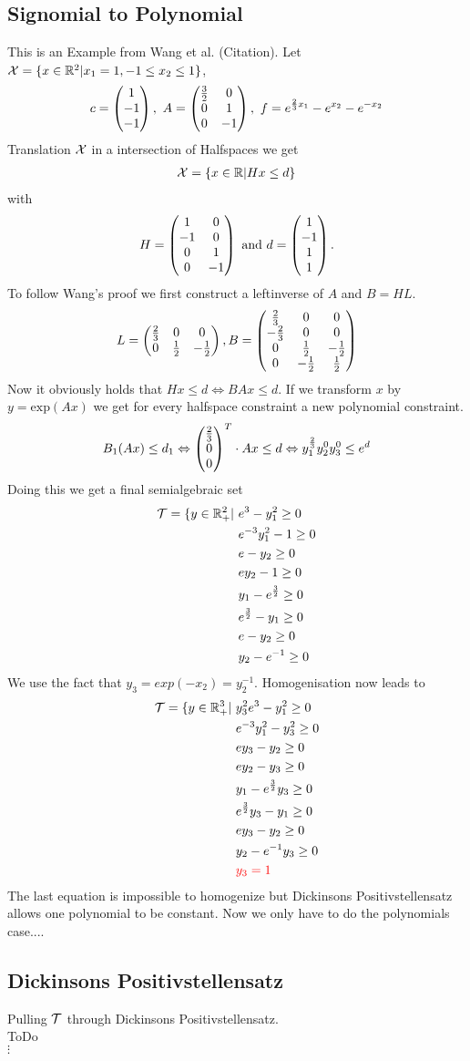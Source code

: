 \documentclass[./main.tex]{subfiles}
\begin{document}
\subsection{Signomial to Polynomial}
This is an Example from Wang et al. (Citation). Let $\mathcal X = \lbrace x \in \mathbb{R}^2 | x_1 = 1, -1\leq x_2 \leq 1 \rbrace$, 
\begin{equation*}
c = \begin{pmatrix}1\\-1\\-1\end{pmatrix}, \ A =  \begin{pmatrix} \frac 3 2 & 0 \\ 0 & 1 \\ 0 & -1 \end{pmatrix}, \ f=e^{\frac 2 3 x_1} - e^{x_2} - e^{-x_2}
\end{equation*}
Translation $\mathcal{X}$ in a intersection of Halfspaces we get
\begin{align*}
\mathcal{X} = \lbrace x \in \mathbb{R} \vert Hx \leq d \rbrace
\end{align*}
with
\begin{align*}
H =  \begin{pmatrix} 1 & 0 \\ -1 & 0 \\ 0 & 1 \\ 0 & -1 \end{pmatrix} \text{ and } d = \begin{pmatrix}1\\-1\\1\\1\end{pmatrix}.
\end{align*}
To follow Wang's proof we first construct a leftinverse of $A$ and $B=HL$.
\begin{align*}
L = \begin{pmatrix} \frac 2 3 & 0 & 0 \\ 0 & \frac 1 2 & -\frac 1 2 \\ \end{pmatrix}, B = \begin{pmatrix} \frac 2 3 & 0 & 0 \\ -\frac 2 3 & 0 & 0 \\ 0 & \frac 1 2 & -\frac 1 2 \\ 0 & -\frac 1 2 & \frac 1 2 \\ \end{pmatrix}
\end{align*}
Now it obviously holds that $Hx \leq d  \Leftrightarrow BAx \leq d$. If we transform $x$ by $y=\text{exp}(Ax)$ we get for every halfspace constraint a new polynomial constraint.
\begin{align*}
B_1(Ax) \leq d_1 \Leftrightarrow  \begin{pmatrix}\frac 2 3\\0\\0\end{pmatrix}^T  \cdot Ax \leq d \Leftrightarrow y_1^{\frac 2 3}y_2^0y_3^0 \leq e^d
\end{align*}
Doing this we get a final semialgebraic set
\begin{align*}
\mathcal{T} = \lbrace y \in \mathbb{R}^2_+ \vert \ & e^3 - y_1^2 \geq 0 \\
& e^{-3}y_1^2 -1 \geq 0 \\
& e - y_2 \geq 0\\
& ey_2 - 1 \geq 0 \\
& y_1 - e^{\frac 3 2} \geq 0 \\
& e^{\frac 3 2} - y_1 \geq 0 \\
&e- y_2 \geq 0 \\
&y_2 -e^{-1}  \geq 0
\end{align*}
We use the fact that $y_3 = exp(-x_2) = y_2^{-1}.$ Homogenisation now leads to
\begin{align*}
\mathcal{T} = \lbrace y \in \mathbb{R}^3_+ \vert \ & y_3^2e^3 - y_1^2 \geq 0 \\
& e^{-3}y_1^2 -y_3^2 \geq 0 \\
& ey_3 - y_2 \geq 0\\
& ey_2 - y_3 \geq 0 \\
& y_1 - e^{\frac 3 2}y_3 \geq 0 \\
& e^{\frac 3 2}y_3 - y_1 \geq 0 \\
&ey_3- y_2 \geq 0 \\
&y_2 -e^{-1}y_3  \geq 0 \\
&\textcolor{red}{y_3 =  1}
\end{align*}
The last equation is impossible to homogenize but Dickinsons Positivstellensatz allows one polynomial to be constant. Now we only have to do the polynomials case....

\subsection{Dickinsons Positivstellensatz}
Pulling $\mathcal{T}$ through Dickinsons Positivstellensatz.\\
ToDo\\
$\vdots$



 
\end{document}
